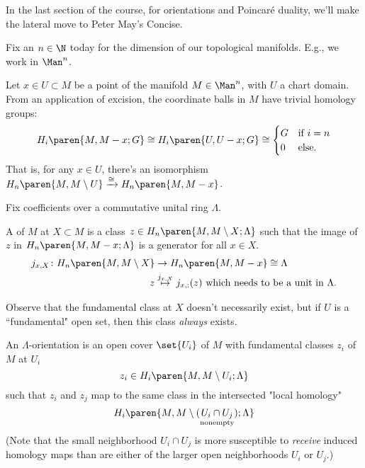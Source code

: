 In the last section of the course, for orientations and Poincaré duality, we'll make the lateral move to Peter May's Concise.

Fix an $n \in \N$ today for the dimension of our topological manifolds. E.g., we work in $\Man^n$.

\begin{rem}
    \label{rem:local_excision}
    Let $x \in U \subset M$ be a point of the manifold $M \in \Man^n$, with $U$ a chart domain. 
    From an application of excision, the coordinate balls in $M$ have trivial homology groups:
    \begin{equation*}
        {H}_{i}\paren{M, M-x; G} \cong {H}_{i}\paren{U, U-x; G} \cong 
        \begin{cases}
            G & \text{if } i = n\\
            0 & \text{else}.
        \end{cases}
    \end{equation*}
    That is, for any $x \in U$, there's an isomorphism ${H}_{n}\paren{M, M \setminus U} \xrightarrow{\cong} {H}_{n}\paren{M, M-x}$.
\end{rem}

Fix coefficients over a commutative unital ring $\Lambda$.

\begin{defn}
    \label{defn:fundamental_class}
    A  of $M$ at $X \subset M$ is a class $z \in {H}_{n}\paren{M, M \setminus X; \Lambda}$ such that the image of $z$ in 
    ${H}_{n}\paren{M, M-x; \Lambda}$ is a generator for all $x \in X$.
    \begin{align*}
        j_{x, X} \colon {H}_{n}\paren{M, M\setminus X}
        &\to {H}_{n}\paren{M, M-x} \cong \Lambda \\
        z  &\overset{j_{x, X}}{\mapsto} j_{x, :} (z)\text{ which needs to be a unit in $\Lambda$.}
    \end{align*}
\end{defn}

\begin{note}[]
   Observe that the fundamental class at $X$ doesn't necessarily exist, but if $U$ is a ``fundamental" open set, then this class \emph{always} exists.
\end{note}

\begin{defn}
    \label{defn:orientation_may_}
    An $\Lambda$-orientation is an open cover $\set{U_i}$ of $M$ with fundamental classes $z_i$ of $M$ at $U_i$ 
    \begin{equation*}
        z_i \in {H}_{i}\paren{M, M\setminus U_i; \Lambda}
    \end{equation*}
    such that $z_i$ and $z_j$ map to the same class in the intersected "local homology"
    \begin{equation*}
       {H}_{i}\paren{M, M\setminus (\underset{\text{nonempty}}{U_i \cap U_j}); \Lambda}
    \end{equation*}
    (Note that the small neighborhood $U_i \cap U_j$ is more susceptible to \emph{receive} induced homology maps than are either of the larger open neighborhoods $U_i$ or $U_j$.) 
\end{defn}


